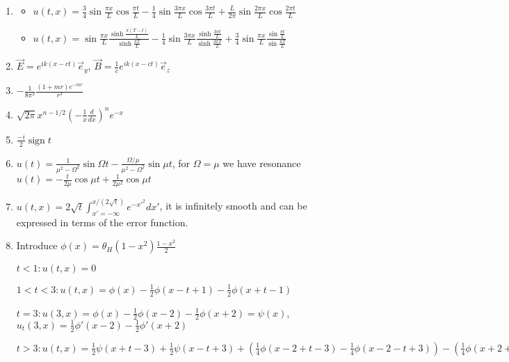 \documentclass[a4paper,11pt]{article}
\begin{document}
\begin{enumerate}
\item\label{item:42} 
\begin{itemize}
\item \(u(t,x)=\frac{3}{4}\sin \frac{\pi x}{L}\cos \frac{\pi t}{L}- \frac{1}{4}\sin \frac{3 \pi x}{L}\cos \frac{3\pi t}{L}+\frac{L}{2\pi}\sin \frac{2\pi x}{L}\cos \frac{2\pi t}{L}\)
\item \(u(t,x)=\sin \frac{\pi x}{L}\frac{\sinh \frac{\pi(T-t)}{L}}{\sinh \frac{\pi T}{L}}- \frac1{4} \sin \frac{3\pi x}{L} \frac{\sinh \frac{3\pi t}{L}}{\sinh \frac{3\pi T}{L}}+ \frac{3}{4}\sin \frac{\pi x}{L} \frac{\sin \frac{\pi t}{L}}{\sin \frac{\pi T}{L}}\)
\end{itemize}

\item\label{item:44} \(\vec{E}=e^{ik(x-ct)}\vec{e}_y\), \(\vec{B}=\frac1{c}e^{ik(x-ct)}\vec{e}_z\)

\item\label{item:43} \(-\frac{1}{8\pi^2} \frac{(1+mr)e^{-mr}}{r^3}\)

\item\label{item:45} \(\sqrt{2\pi}x^{n-1/2} \left(-\frac1{x}\frac{d}{dx} \right)^n e^{-x}\)

\item\label{item:46} \(\frac{-i}{2}\operatorname{sign} t\)

\item\label{item:47} \(u(t)=\frac{1}{\mu^2-\Omega^2}\sin \Omega t - \frac{\Omega/\mu}{\mu^2-\Omega^2}\sin \mu t\), for \(\Omega=\mu\) we have resonance \(u(t)= -\frac{t}{2\mu}\cos \mu t+\frac1{2\mu^2}\cos \mu t\)

\item\label{item:48} \(u(t,x)=2 \sqrt{t}\int_{x'=-\infty}^{x/(2 \sqrt{t})} e^{-x'^2}dx'\), it is infinitely smooth and can be expressed in terms of the error function.

\item\label{item:49}

Introduce \(\phi(x)=\theta_H(1-x^2)\frac{1-x^2}{2}\)

\(t<1: u(t,x)=0\)

\(1<t<3: u(t,x)=\phi(x)-\frac12 \phi(x-t+1)-\frac12 \phi(x+t-1)\)

\(t=3: u(3,x)=\phi(x)-\frac12 \phi(x-2)-\frac12 \phi(x+2)=\psi(x)\), \(u_t(3,x)=\frac12 \phi'(x-2)-\frac12 \phi'(x+2)\)

\(t>3: u(t,x)=\frac12\psi(x+t-3)+\frac12\psi(x-t+3)+(\frac1{4}\phi(x-2+t-3)-\frac1{4}\phi(x-2-t+3))-(\frac1{4}\phi(x+2+t-3)-\frac1{4}\phi(x+2-t+3))\)



\end{enumerate}
\end{document}
